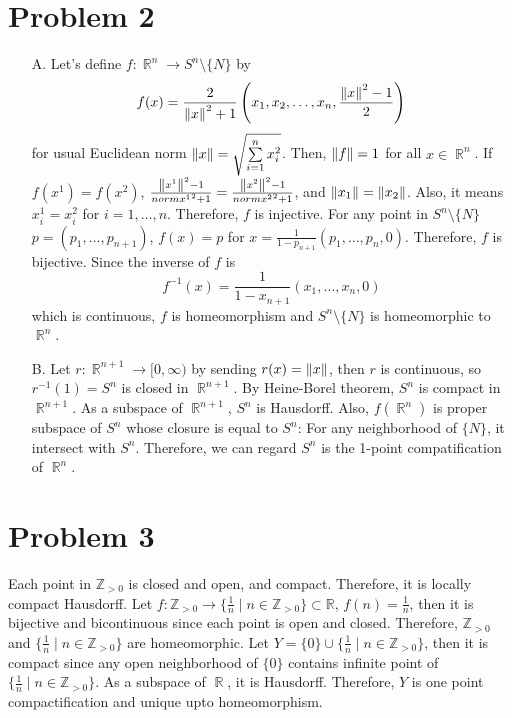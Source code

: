 \documentclass{article}
\DeclareMathOperator{\rr}{\mathbb{R}}
\begin{document}
\section*{Problem 2}
\begin{enumerate}
\item[A.] Let's define $f:\rr^n\rightarrow S^{n}\setminus\{N\}$ by
\begin{equation*}
f(x)=\frac{2}{\norm{x}^2+1}\left(x_1, x_2, \ldots, x_n, \frac{\norm{x}^2-1}{2}\right)
\end{equation*}
for usual Euclidean norm $\norm{x}=\sqrt{\sum\limits_{i=1}^n x_i^2}$. Then, $\norm{f}=1$ for all $x\in \rr^n$. If $f(x^1)=f(x^2)$, $\frac{\norm{x^1}^2-1}{norm{x^1}^2+1}=\frac{\norm{x^2}^2-1}{norm{x^2}^2+1}$, and $\norm{x_1}=\norm{x_2}$. Also, it means $x^1_i=x^2_i$ for $i=1, \ldots, n$. Therefore, $f$ is injective. For any point in $S^n\setminus\{N\}$ $p=(p_1, \ldots, p_{n+1})$, $f(x)=p$ for $x=\frac{1}{1-p_{n+1}}(p_1, \ldots, p_n, 0)$. Therefore, $f$ is bijective. Since the inverse of $f$ is
\begin{equation*}
f^{-1}(x)=\frac{1}{1-x_{n+1}}(x_1, \ldots, x_n, 0)
\end{equation*}
which is continuous, $f$ is homeomorphism and $S^n\setminus\{N\}$ is homeomorphic to $\rr^n$.
\item[B.] Let $r:\rr^{n+1}\rightarrow [0, \infty)$ by sending $r(x)=\norm{x}$, then $r$ is continuous, so $r^{-1}(1)=S^{n}$ is closed in $\rr^{n+1}$. By Heine-Borel theorem, $S^n$ is compact in $\rr^{n+1}$. As a subspace of $\rr^{n+1}$, $S^n$ is Hausdorff. Also, $f(\rr^n)$ is proper subspace of $S^n$ whose closure is equal to $S^n$: For any neighborhood of $\{N\}$, it intersect with $S^n$. Therefore, we can regard $S^n$ is the 1-point compatification of $\rr^n$.
\end{enumerate}
\section*{Problem 3}
Each point in $\mathbb{Z}_{>0}$ is closed and open, and compact. Therefore, it is locally compact Hausdorff. Let $f:\mathbb{Z}_{>0}\rightarrow \{\frac{1}{n} \mid n\in \mathbb{Z}_{>0}\}\subset \mathbb{R}$, $f(n)=\frac{1}{n}$, then it is bijective and bicontinuous since each point is open and closed. Therefore, $\mathbb{Z}_{>0}$ and $\{\frac{1}{n} \mid n\in \mathbb{Z}_{>0}\}$ are homeomorphic. Let $Y=\{0\}\cup \{\frac{1}{n} \mid n\in \mathbb{Z}_{>0}\}$, then it is compact since any open neighborhood of $\{0\}$ contains infinite point of $\{\frac{1}{n} \mid n\in \mathbb{Z}_{>0}\}$. As a subspace of $\rr$, it is Hausdorff. Therefore, $Y$ is one point compactification and unique upto homeomorphism.
\end{document}
